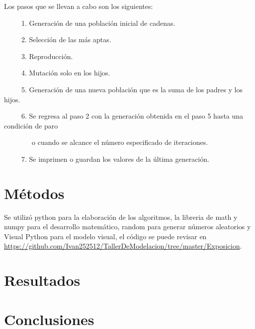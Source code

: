 \documentclass[12pt,letterpaper]{article}
\begin{document}
Los pasos que se llevan a cabo son los siguientes:

\ \ \ \ \ 1. Generación de una población inicial de cadenas.

\ \ \ \ \ 2. Selección de las más aptas.

\ \ \ \ \ 3. Reproducción.

\ \ \ \ \ 4. Mutación solo en los hijos.

\ \ \ \ \ 5. Generación de una nueva población que es la suma de los padres y los hijos.

\ \ \ \ \ 6. Se regresa al paso 2 con la generación obtenida en el paso 5 hasta una condición de paro 

\ \ \ \ \ \ \ \ o cuando se alcance el número especificado de iteraciones.

\ \ \ \ \ 7. Se imprimen o guardan los valores de la última generación.

\section*{Métodos}

Se utilizó python para la elaboración de los algoritmos, la libreria de math y numpy para el desarrollo matemático, random para generar números aleatorios y Visual Python para el modelo visual, el código se puede revisar en \url{https://github.com/Ivan252512/TallerDeModelacion/tree/master/Exposicion}.

\section*{Resultados}

\section*{Conclusiones}
\end{document}
